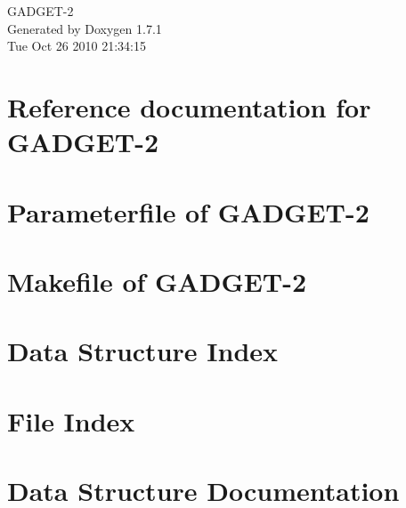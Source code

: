 \documentclass[a4paper]{book}
\begin{document}
\hypersetup{pageanchor=false}
\begin{titlepage}
\vspace*{7cm}
\begin{center}
{\Large GADGET-\/2 }\\
\vspace*{1cm}
{\large Generated by Doxygen 1.7.1}\\
\vspace*{0.5cm}
{\small Tue Oct 26 2010 21:34:15}\\
\end{center}
\end{titlepage}
\clearemptydoublepage
{}
\tableofcontents
\clearemptydoublepage
{}
\hypersetup{pageanchor=true}
\chapter{Reference documentation for GADGET-\/2}
\label{index}\hypertarget{index}{}
\chapter{Parameterfile of GADGET-\/2}
\label{parameterfile}
\hypertarget{parameterfile}{}

\chapter{Makefile of GADGET-\/2}
\label{Gadget-Makefile}
\hypertarget{Gadget-Makefile}{}

\chapter{Data Structure Index}

\chapter{File Index}

\chapter{Data Structure Documentation}

















\end{document}
